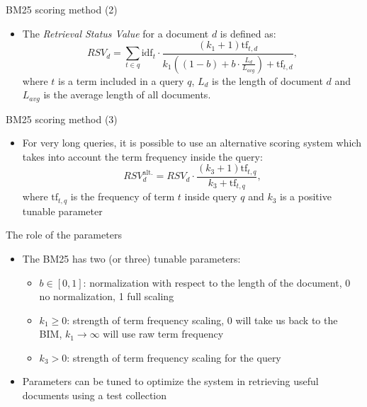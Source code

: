 \documentclass[]{beamer}
\begin{document}
\begin{frame}{BM25 scoring method (2)}
    \begin{itemize}
        \item The \textit{Retrieval Status Value} for a document $d$ is defined as:
    \begin{equation*}
        RSV_d = \sum_{t \in q}^{} \text{idf}_t \cdot \frac{(k_1 + 1) \text{tf}_{t,d}}{k_1((1-b)+b \cdot \frac{L_d}{L_{avg}})+\text{tf}_{t,d}},
    \end{equation*}
    where $t$ is a term included in a query $q$, $L_d$ is the length of document $d$ and $L_{avg}$ is the average length of all documents.
    \end{itemize}
\end{frame}

\begin{frame}{BM25 scoring method (3)}
    \begin{itemize}
        \item For very long queries, it is possible to use an alternative scoring system which takes into account the term frequency inside the query:
        \begin{equation*}
            RSV^{\text{alt.}}_d = RSV_d \cdot \frac{(k_3 +1)\text{tf}_{t,q}}{k_3 + \text{tf}_{t,q}},
        \end{equation*}
        where $\text{tf}_{t,q}$ is the frequency of term $t$ inside query $q$ and $k_3$ is a positive tunable parameter
    \end{itemize}
\end{frame}

\begin{frame}{The role of the parameters}
    \begin{itemize}
        \item The BM25 has two (or three) tunable parameters:
        \begin{itemize}
            \item $b \in [0,1]$: normalization with respect to the length of the document, 0 no normalization, 1 full scaling
            \item $k_1 \geq 0$: strength of term frequency scaling, 0 will take us back to the BIM, $k_1 \rightarrow \infty$ will use raw term frequency
            \item $k_3 > 0$: strength of term frequency scaling for the query
        \end{itemize}
        \item Parameters can be tuned to optimize the system in retrieving useful documents using a test collection
    \end{itemize}
\end{frame}
\end{document}

